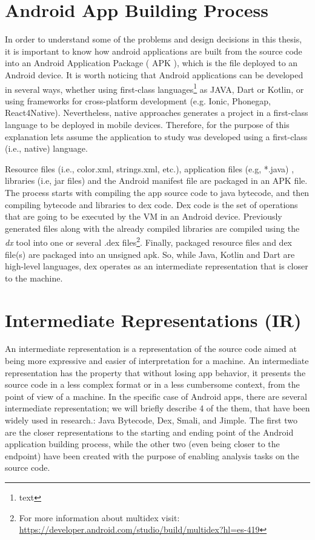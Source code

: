 \section{Android App Building Process}

In order to understand some of the problems and design decisions  in this thesis, it is important to know how android applications are built from the source code into an Android Application Package ( APK ), which is the file deployed to an Android device. It is worth noticing that Android applications can be developed in several ways, whether using first-class languages\footnote{text} as JAVA, Dart or Kotlin, or using frameworks for cross-platform development (e.g. Ionic, Phonegap, React4Native). Nevertheless, native approaches generates a project in a first-class language to be deployed in mobile devices. Therefore, for the purpose of this explanation lets assume the application to study was developed using a first-class (i.e., native) language. 

Resource files (i.e., color.xml, strings.xml, etc.), application files (e.g, *.java) , libraries  (i.e, jar files) and the Android manifest file are packaged in an APK file. The process starts with compiling the app source code to java bytecode, and then compiling bytecode  and libraries to dex code. Dex code is the set of operations that are going to be executed by the VM in an Android device. Previously generated files along with the already compiled libraries are compiled using the  \textit{dx} tool into one or several .dex files\footnote{For more information about multidex visit: \url{https://developer.android.com/studio/build/multidex?hl=es-419}}. Finally, packaged resource files and dex file(s) are packaged into an unsigned apk. So, while Java, Kotlin and Dart are high-level languages, dex operates as an intermediate representation that is closer to the machine.


\section{Intermediate Representations (IR)}

An intermediate representation is a representation of the source code aimed at being more expressive  and easier of interpretation for a machine. An intermediate representation has the property that without losing app behavior, it presents the source code in a less complex format or in a less cumbersome context, from the point of view of a machine. In the specific case of Android apps, there are several intermediate  representation; we will briefly describe 4  of the them, that have been widely used in research.:  Java Bytecode, Dex, Smali, and Jimple. The first two are the closer representations to the starting and ending point of the Android application building process, while the other two (even being closer to the endpoint) have been created with the purpose of enabling analysis tasks on the source code. 

